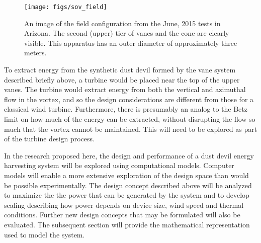   \begin{figure}[!htb]
    \begin{center}
     \texttt{[image: figs/sov\_field]}
     \caption{An image of the field configuration from the June, 2015
     tests in Arizona. The second (upper) tier of vanes and the cone are
     clearly visible. This apparatus has an outer diameter of
     approximately three meters.}
     \label{fig:field_test}
    \end{center}
  \end{figure}

To extract energy from the synthetic dust devil formed by the vane
system described briefly above, a turbine would be placed near the top
of the upper vanes. The turbine would extract energy from both the
vertical and azimuthal flow in the vortex, and so the design
considerations are different from those for a classical wind turbine.
Furthermore, there is presumably an analog to the Betz limit on how
much of the energy can be extracted, without disrupting the flow so
much that the vortex cannot be maintained. This will need to be
explored as part of the turbine design process.

In the research proposed here, the design and performance of a dust
devil energy harvesting system will be explored using computational
models. Computer models will enable a more extensive exploration of
the design space than would be possible experimentally. The design
concept described above will be analyzed to maximize the the
power that can be generated by the system and to develop scaling
describing how power depends on device size, wind speed and thermal
conditions. Further new design concepts that may be formulated will
also be evaluated. The subsequent section will provide the mathematical
representation used to model the system.  

%
%
%


